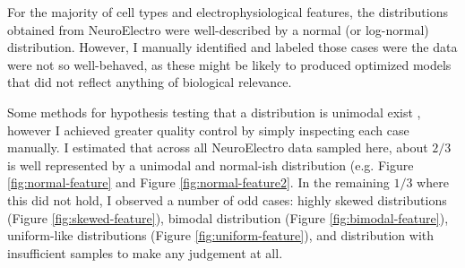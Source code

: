 
%

%    
%
%
%

%
For the majority of cell types and electrophysiological features, the distributions obtained from NeuroElectro were well-described by a normal (or log-normal) distribution.
However, I manually identified and labeled those cases were the data were not so well-behaved, as these might be likely to produced optimized models that did not reflect anything of biological relevance.

Some methods for hypothesis testing that a distribution is unimodal exist \citep{maechler2013package}, however I achieved greater quality control by simply inspecting each case manually.
I estimated that across all NeuroElectro data sampled here, about $2/3$ is well represented by a unimodal and normal-ish distribution (e.g. Figure \ref{fig:normal-feature} and Figure \ref{fig:normal-feature2}.
In the remaining $1/3$ where this did not hold, I observed a number of odd cases: highly skewed distributions (Figure \ref{fig:skewed-feature}), bimodal distribution (Figure \ref{fig:bimodal-feature}), uniform-like distributions (Figure \ref{fig:uniform-feature}), and distribution with insufficient samples to make any judgement at all.

